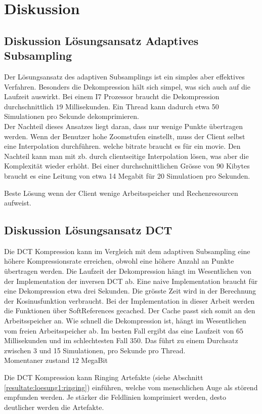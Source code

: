 \section{Diskussion}

\subsection{Diskussion Lösungsansatz Adaptives Subsampling}
Der Lösungsansatz des adaptiven Subsamplings ist ein simples aber effektives Verfahren. Besonders die Dekompression hält sich simpel, was sich auch auf die Laufzeit auswirkt. Bei einem I7 Prozessor braucht die Dekompression durchschnittlich $19$ Millisekunden. Ein Thread kann dadurch etwa 50 Simulationen pro Sekunde dekomprimieren.\\
Der Nachteil dieses Ansatzes liegt daran, dass nur wenige Punkte übertragen werden. Wenn der Benutzer hohe Zoomstufen einstellt, muss der Client selbst eine Interpolation durchführen.
welche bitrate braucht es für ein movie. Den Nachteil kann man mit zb. durch clientseitige Interpolation lösen, was aber die Komplexität wieder erhöht. Bei einer durchschnittlichen Grösse von $90$ Kibytes braucht es eine Leitung von etwa 14 Megabit für 20 Simulatioen pro Sekunden.

Beste Lösung wenn der Client wenige Arbeitsspeicher und Rechenresourcen aufweist.

\subsection{Diskussion Lösungsansatz DCT}
Die DCT Kompression kann im Vergleich mit dem adaptiven Subsampling eine höhere Kompressionsrate erreichen, obwohl eine höhere Anzahl an Punkte übertragen werden. Die Laufzeit der Dekompression hängt im Wesentlichen von der Implementation der inversen DCT ab. Eine naive Implementation braucht für eine Dekompression etwa drei Sekunden. Die grösste Zeit wird in der Berechnung der Kosinusfunktion verbraucht. Bei der Implementation in dieser Arbeit werden die Funktionen über SoftReferences gecached. Der Cache passt sich somit an den Arbeitsspeicher an. Wie schnell die Dekompression ist, hängt im Wesentlichen vom freien Arbeitsspeicher ab. Im besten Fall ergibt das eine Laufzeit von $65$ Millisekunden und im schlechtesten Fall $350$. Das führt zu einem Durchsatz zwischen 3 und 15 Simulationen, pro Sekunde pro Thread.\\
Momentaner zustand $12$ MegaBit

Die DCT Kompression kann Ringing Artefakte (siehe Abschnitt  \ref{resultate:loesung1:ringing}) einführen, welche vom menschlichen Auge als störend empfunden werden. Je stärker die Feldlinien komprimiert werden, desto deutlicher werden die Artefakte. 

